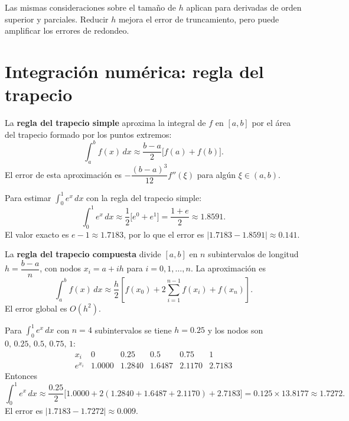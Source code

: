 \documentclass[a4,11pt]{aleph-notas}
\begin{document}
\begin{advertencia}
    Las mismas consideraciones sobre el tamaño de $h$ aplican para derivadas de orden superior y parciales. Reducir $h$ mejora el error de truncamiento, pero puede amplificar los errores de redondeo.
\end{advertencia}


\newpage
\section{Integración numérica: regla del trapecio}

\begin{defi}
    La \textbf{regla del trapecio simple} aproxima la integral de $f$ en $[a,b]$ por el área del trapecio formado por los puntos extremos:
    \[
        \int_a^b f(x)\,dx \approx \frac{b-a}{2}\bigl[f(a)+f(b)\bigr].
    \]
    El error de esta aproximación es $-\dfrac{(b-a)^3}{12}f''(\xi)$ para algún $\xi\in(a,b)$.
\end{defi}

\begin{ejem}
    Para estimar $\displaystyle\int_0^1 e^x\,dx$ con la regla del trapecio simple:
    \[
        \int_0^1 e^x\,dx\approx\frac{1}{2}\bigl[e^0+e^1\bigr]=\frac{1+e}{2}\approx 1.8591.
    \]
    El valor exacto es $e-1\approx 1.7183$, por lo que el error es $|1.7183-1.8591|\approx 0.141$.
\end{ejem}

\begin{defi}
    La \textbf{regla del trapecio compuesta} divide $[a,b]$ en $n$ subintervalos de longitud $h=\dfrac{b-a}{n}$, con nodos $x_i=a+ih$ para $i=0,1,\ldots,n$. La aproximación es
    \[
        \int_a^b f(x)\,dx\approx\frac{h}{2}\left[f(x_0)+2\sum_{i=1}^{n-1}f(x_i)+f(x_n)\right].
    \]
    El error global es $O(h^2)$.
\end{defi}

\begin{ejem}
    Para $\displaystyle\int_0^1 e^x\,dx$ con $n=4$ subintervalos se tiene $h=0.25$ y los nodos son $0,\,0.25,\,0.5,\,0.75,\,1$:
    \[
        \begin{array}{c|ccccc}
            x_i & 0 & 0.25 & 0.5 & 0.75 & 1\\
            \hline
            e^{x_i} & 1.0000 & 1.2840 & 1.6487 & 2.1170 & 2.7183
        \end{array}
    \]
    Entonces
    \[
        \int_0^1 e^x\,dx
        \approx
        \frac{0.25}{2}\bigl[1.0000+2(1.2840+1.6487+2.1170)+2.7183\bigr]
        =
        0.125\times 13.8177
        \approx
        1.7272.
    \]
    El error es $|1.7183-1.7272|\approx 0.009$.
\end{ejem}
\end{document}
